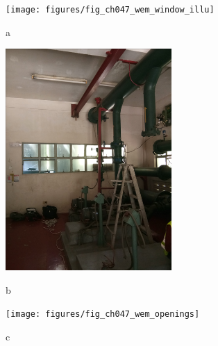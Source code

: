 \begin{figure}[!htb]
	\begin{minipage}[b]{0.225\linewidth}
		\centering
		\texttt{[image: figures/fig\_ch047\_wem\_window\_illu]}
		\caption*{a}
	\end{minipage}
	\hspace{0.05cm}
	\begin{minipage}[b]{0.225\linewidth}
		\centering
		\includegraphics[width=\textwidth]{figures/fig_ch047_wem_illuA}
		\caption*{b}
	\end{minipage}
	\hspace{0.05cm}
	\begin{minipage}[b]{0.225\linewidth}
		\centering
		\texttt{[image: figures/fig\_ch047\_wem\_openings]}
		\caption*{c}
	\end{minipage}
	\hspace{0.05cm}
	\begin{minipage}[b]{0.225\linewidth}

\end{minipage}
\end{figure}
